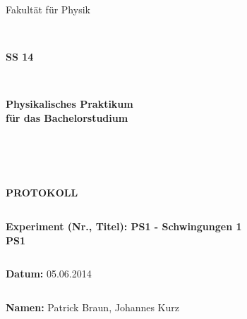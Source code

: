 \documentclass[12pt,a4paper]{article}
\begin{document}
\thispagestyle{empty}
			\begin{center}
			\Large{Fakultät für Physik}\\
			\end{center}
\begin{verbatim}


\end{verbatim}
			\begin{center}
			\textbf{\LARGE SS 14}
			\end{center}
\begin{verbatim}


\end{verbatim}
			\begin{center}
			\textbf{\LARGE{Physikalisches Praktikum\\ für das Bachelorstudium}}
			\end{center}
\begin{verbatim}




\end{verbatim}

			\begin{center}
			\textbf{\LARGE{PROTOKOLL}}
			\end{center}
			
\begin{verbatim}

\end{verbatim}

			\begin{flushleft}
			\textbf{\Large{Experiment (Nr., Titel): PS1 - Schwingungen 1}\\
			\LARGE{PS1}}	
			\end{flushleft}

\begin{verbatim}

\end{verbatim}	
			\begin{flushleft}
			\textbf{\Large{Datum:}} \Large{05.06.2014}
			\end{flushleft}
			
\begin{verbatim}
\end{verbatim}
		\begin{flushleft}
			\textbf{\Large{Namen:}} \Large{Patrick Braun, Johannes Kurz}
			\end{flushleft}
\end{document}
